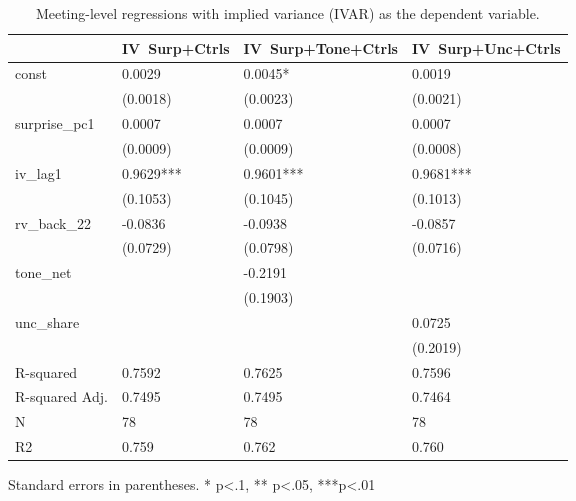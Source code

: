 \begin{table}
\caption{Meeting-level regressions with implied variance (IVAR) as the dependent variable.}
\label{tab:meet_iv_controls}
\begin{center}
\begin{tabular}{llll}
\hline
               & IV~Surp+Ctrls & IV~Surp+Tone+Ctrls & IV~Surp+Unc+Ctrls  \\
\hline
const          & 0.0029        & 0.0045*            & 0.0019             \\
               & (0.0018)      & (0.0023)           & (0.0021)           \\
surprise\_pc1  & 0.0007        & 0.0007             & 0.0007             \\
               & (0.0009)      & (0.0009)           & (0.0008)           \\
iv\_lag1       & 0.9629***     & 0.9601***          & 0.9681***          \\
               & (0.1053)      & (0.1045)           & (0.1013)           \\
rv\_back\_22   & -0.0836       & -0.0938            & -0.0857            \\
               & (0.0729)      & (0.0798)           & (0.0716)           \\
tone\_net      &               & -0.2191            &                    \\
               &               & (0.1903)           &                    \\
unc\_share     &               &                    & 0.0725             \\
               &               &                    & (0.2019)           \\
R-squared      & 0.7592        & 0.7625             & 0.7596             \\
R-squared Adj. & 0.7495        & 0.7495             & 0.7464             \\
N              & 78            & 78                 & 78                 \\
R2             & 0.759         & 0.762              & 0.760              \\
\hline
\end{tabular}
\end{center}
\end{table}
\bigskip
Standard errors in parentheses. \newline 
* p<.1, ** p<.05, ***p<.01